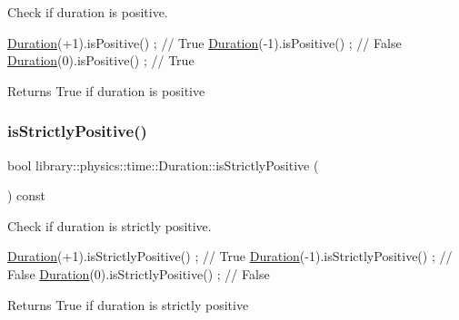 Check if duration is positive. 


\begin{DoxyCode}
\hyperlink{classlibrary_1_1physics_1_1time_1_1_duration_a0a70efcf487a841da572afcf00001f64}{Duration}(+1).isPositive() ; \textcolor{comment}{// True}
\hyperlink{classlibrary_1_1physics_1_1time_1_1_duration_a0a70efcf487a841da572afcf00001f64}{Duration}(-1).isPositive() ; \textcolor{comment}{// False}
\hyperlink{classlibrary_1_1physics_1_1time_1_1_duration_a0a70efcf487a841da572afcf00001f64}{Duration}(0).isPositive() ; \textcolor{comment}{// True}
\end{DoxyCode}


\begin{DoxyReturn}{Returns}
True if duration is positive 
\end{DoxyReturn}
\mbox{\label{classlibrary_1_1physics_1_1time_1_1_duration_a2d4f7691e997232d4d9b88e7d4ab49d7}} 
\subsubsection{\texorpdfstring{is\+Strictly\+Positive()}{isStrictlyPositive()}}
{\footnotesize\ttfamily bool library\+::physics\+::time\+::\+Duration\+::is\+Strictly\+Positive (\begin{DoxyParamCaption}{ }\end{DoxyParamCaption}) const}



Check if duration is strictly positive. 


\begin{DoxyCode}
\hyperlink{classlibrary_1_1physics_1_1time_1_1_duration_a0a70efcf487a841da572afcf00001f64}{Duration}(+1).isStrictlyPositive() ; \textcolor{comment}{// True}
\hyperlink{classlibrary_1_1physics_1_1time_1_1_duration_a0a70efcf487a841da572afcf00001f64}{Duration}(-1).isStrictlyPositive() ; \textcolor{comment}{// False}
\hyperlink{classlibrary_1_1physics_1_1time_1_1_duration_a0a70efcf487a841da572afcf00001f64}{Duration}(0).isStrictlyPositive() ; \textcolor{comment}{// False}
\end{DoxyCode}


\begin{DoxyReturn}{Returns}
True if duration is strictly positive 
\end{DoxyReturn}
\mbox{\label{classlibrary_1_1physics_1_1time_1_1_duration_a7f14980ea22f7e9cad122f7a37ba50be}} 
